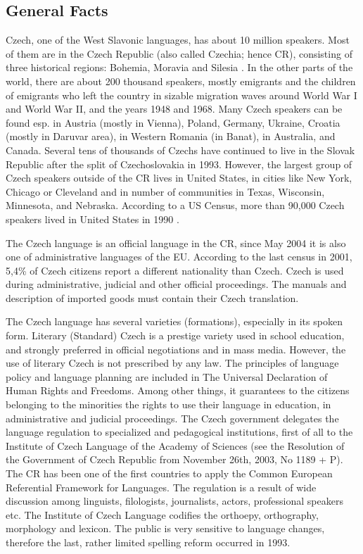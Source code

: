 \begin{multicols}{2}

\subsection{General Facts}

Czech, one of the West Slavonic languages, has about 10 million speakers. Most of them are in the Czech Republic (also called Czechia; hence CR), consisting of three historical regions: Bohemia, Moravia and Silesia \cite{Note1}. In the other parts of the world, there are about 200 thousand speakers, mostly emigrants and the children of emigrants who left the country in sizable migration waves around World War I and World War II, and the years 1948 and 1968. Many Czech speakers can be found esp. in Austria (mostly in Vienna), Poland, Germany, Ukraine, Croatia (mostly in Daruvar area), in Western Romania (in Banat), in Australia, and Canada. Several tens of thousands of Czechs have continued to live in the Slovak Republic after the split of Czechoslovakia in 1993. However, the largest group of Czech speakers outside of the CR lives in United States, in cities like New York, Chicago or Cleveland and in number of communities in Texas, Wisconsin, Minnesota, and Nebraska. According to a US Census, more than 90,000 Czech speakers lived in United States in 1990 \cite{Note2}.

The Czech language is an official language in the CR, since May 2004 it is also one of administrative languages of the EU. According to the last census in 2001, 5,4\% of Czech citizens report a different nationality than Czech. Czech is used during administrative, judicial and other official proceedings. The manuals and description of imported goods must contain their Czech translation.

The Czech language has several varieties (formations), especially in its spoken form. Literary (Standard) Czech is a prestige variety used in school education, and strongly preferred in official negotiations and in mass media. However, the use of literary Czech is not prescribed by any law. The principles of language policy and language planning are included in The Universal Declaration of Human Rights and Freedoms. Among other things, it guarantees to the citizens belonging to the minorities the rights to use their language in education, in administrative and judicial proceedings. The Czech government delegates the language regulation to specialized and pedagogical institutions, first of all to the Institute of Czech Language of the Academy of Sciences (see the Resolution of the Government of Czech Republic from November 26th, 2003, No 1189 + P). The CR has been one of the first countries to apply the Common European Referential Framework for Languages. The regulation is a result of wide discussion among linguists, filologists, journalists, actors, professional speakers etc. The Institute of Czech Language codifies the orthoepy, orthography, morphology and lexicon. The public is very sensitive to language changes, therefore the last, rather limited spelling reform occurred in 1993.


\end{multicols}
